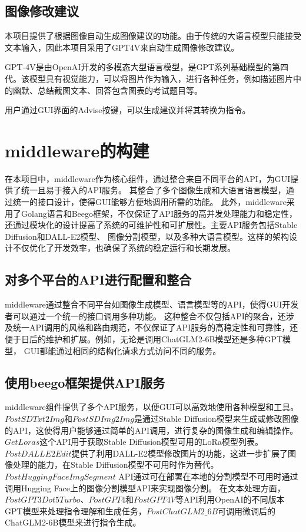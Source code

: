 \documentclass[a4paper,AutoFakeBold,oneside,12pt]{book}
\begin{document}
\section{图像修改建议}
本项目提供了根据图像自动生成图像建议的功能。由于传统的大语言模型只能接受文本输入，因此本项目采用了GPT4V来自动生成图像修改建议。

GPT-4V是由OpenAI开发的多模态大型语言模型，是GPT系列基础模型的第四代。该模型具有视觉能力，可以将图片作为输入，进行各种任务，例如描述图片中的幽默、总结截图文本、回答包含图表的考试题目等。

用户通过GUI界面的Advise按键，可以生成建议并将其转换为指令。

\chapter{middleware的构建} %
在本项目中，middleware作为核心组件，通过整合来自不同平台的API，为GUI提供了统一且易于接入的API服务。
其整合了多个图像生成和大语言语言模型，通过统一的接口设计，使得GUI能够方便地调用所需的功能。
此外，middleware采用了Golang语言和Beego框架，不仅保证了API服务的高并发处理能力和稳定性，
还通过模块化的设计提高了系统的可维护性和可扩展性。主要API服务包括Stable Diffusion和DALL-E2模型、
图像分割模型，以及多种大语言模型。这样的架构设计不仅优化了开发效率，也确保了系统的稳定运行和长期发展。
\section{对多个平台的API进行配置和整合}
middleware通过整合不同平台如图像生成模型、语言模型等的API，使得GUI开发者可以通过一个统一的接口调用多种功能。
这种整合不仅包括API的聚合，还涉及统一API调用的风格和路由规范，不仅保证了API服务的高稳定性和可靠性，还便于日后的维护和扩展。例如，无论是调用ChatGLM2-6B模型还是多种GPT模型，
GUI都能通过相同的结构化请求方式访问不同的服务。


\section{使用beego框架提供API服务}
middleware组件提供了多个API服务，以便GUI可以高效地使用各种模型和工具。
$PostSDTxt2Img$和$PostSDImg2Img$是通过Stable Diffusion模型来生成或修改图像的API，这使得用户能够通过简单的API调用，进行复杂的图像生成和编辑操作。$GetLoras$这个API用于获取Stable Diffusion模型可用的LoRa模型列表。
$PostDALLE2Edit$提供了利用DALL-E2模型修改图片的功能，这进一步扩展了图像处理的能力，在Stable Diffusion模型不可用时作为替代。
$PostHuggingFaceImgSegment$ API通过可在部署在本地的分割模型不可用时通过调用Hugging Face上的图像分割模型API来实现图像分割。
在文本处理方面，$PostGPT3Dot5Turbo$、$PostGPT4$和$PostGPT4V$等API利用OpenAI的不同版本GPT模型来处理指令理解和生成任务，$PostChatGLM2\_6B$可调用微调后的ChatGLM2-6B模型来进行指令生成。
\end{document}
